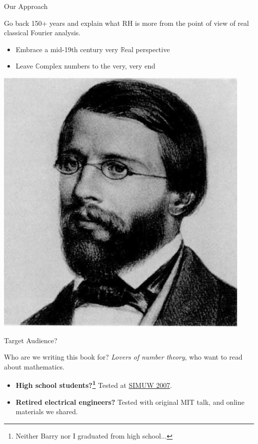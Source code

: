 \documentclass{beamer}
\begin{document}
\begin{frame}{Our Approach}
  \begin{block}{}
    Go back 150+ years and explain what RH is more from the point of view of real classical Fourier analysis.
            \begin{itemize}
              \item Embrace a mid-19th century very $\mathbb{R}$eal perspective
              \item Leave $\mathbb{C}$omplex numbers to the very, very end
            \end{itemize}
  \end{block}
  \begin{center}
    \includegraphics[height=.5\textheight]{pics/riemann}
  \end{center}

\end{frame}


\begin{frame}{Target Audience?}

\begin{block}{Who are we writing this book for?}
{\em Lovers of number theory}, who want to read about mathematics.
\vspace{.5in}

  \begin{itemize}
    \item \textbf{High school students?\footnote{Neither Barry nor I  graduated from high school...}} Tested at \href{https://wstein.org/edu/2007/simuw07/}{SIMUW 2007}.
    \item \textbf{Retired electrical engineers?}  Tested with original MIT talk, and  online materials we shared.
  \end{itemize}
\vspace{.5in}

\end{block}

\end{frame}
\end{document}
